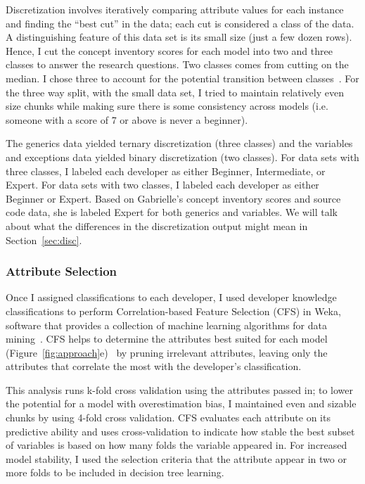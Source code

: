Discretization involves iteratively comparing attribute values for each instance and finding the ``best cut'' in the data; each cut is considered a class of the data. A distinguishing feature of this data set is its small size (just a few dozen rows). Hence, I cut the concept inventory scores for each model into two and three classes to answer the research questions. Two classes comes from cutting on the median. I chose three to account for the potential transition between classes~\cite{dreyfus2004five}. For the three way split, with the small data set, I tried to maintain relatively even size chunks while making sure there is some consistency across models (i.e. someone with a score of 7 or above is never a beginner).

The generics data yielded ternary discretization (three classes) and the variables and exceptions data yielded binary discretization (two classes). For data sets with three classes, I labeled each developer as either Beginner, Intermediate, or Expert. For data sets with two classes, I labeled each developer as either Beginner or Expert.	
Based on Gabrielle's concept inventory scores and source code data, she is labeled Expert for both generics and variables. 
We will talk about what the differences in the discretization output might mean in Section~\ref{sec:disc}.

\subsubsection{Attribute Selection}
Once I assigned classifications to each developer, I used developer knowledge classifications to perform Correlation-based Feature Selection (CFS) in Weka, software that provides a collection of machine learning algorithms for data mining~\cite{Hall:2009:WDM:1656274.1656278}. CFS helps to determine the attributes best suited for each model (Figure~\ref{fig:approach}e)~\cite{hall1999correlation} by pruning irrelevant attributes, leaving only the attributes that correlate the most with the developer's classification.

This analysis runs k-fold cross validation using the attributes passed in; to lower the potential for a model with overestimation bias, I maintained even and sizable chunks by using 4-fold cross validation.	
CFS evaluates each attribute on its predictive ability and uses cross-validation to indicate how stable the best subset of variables is based on how many folds the variable appeared in.
For increased model stability, I used the selection criteria that the attribute appear in two or more folds to be included in decision tree learning.

